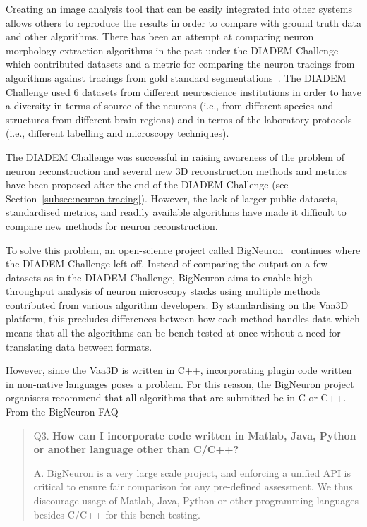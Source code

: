 Creating an image analysis tool that can be easily integrated into
other systems allows others to reproduce the results in order to
compare with ground truth data and other algorithms. There
has been an attempt at comparing neuron morphology extraction
algorithms in the past under the DIADEM Challenge which
contributed datasets and a metric for comparing the neuron
tracings from algorithms against tracings from gold standard
segmentations~\autocite{DIADEM&Beyond:Liu:2011,DIADEM-dataset:Brown:2011,DIADEM-metric-Gillette2011}.
The DIADEM Challenge used 6 datasets from different neuroscience
institutions in order to have a diversity in terms of source of
the neurons (i.e., from different species and structures from
different brain regions) and in terms of the laboratory protocols
(i.e., different labelling and microscopy techniques).

The DIADEM Challenge was successful in raising awareness of the
problem of neuron reconstruction and several new 3D reconstruction
methods and metrics have been proposed after the end of the DIADEM
Challenge (see Section~\ref{subsec:neuron-tracing}).  However, the
lack of larger public datasets, standardised metrics, and readily
available algorithms have made it difficult to compare new methods
for neuron reconstruction.

To solve this problem, an open-science project called
BigNeuron~\autocite{BigNeuron:Peng:2015,DIADEM2BigNeuron:Peng:2015}
continues where the DIADEM Challenge left off. Instead of
comparing the output on a few datasets as in the DIADEM Challenge,
BigNeuron aims to enable high-throughput analysis of neuron
microscopy stacks using multiple methods contributed from various
algorithm developers. By standardising on the Vaa3D platform, this
precludes differences between how each method handles data which
means that all the algorithms can be bench-tested at once without
a need for translating data between formats.

However, since the Vaa3D is written in C++, incorporating plugin
code written in non-native languages poses a problem. For this
reason, the BigNeuron project organisers recommend that all
algorithms that are submitted be in C or C++. From the BigNeuron
FAQ~\autocite{BigNeuron:FAQ:2015}\\
\parbox{\textwidth}{
\begin{quote}
	\begin{fancyquote}
		{Q3. \bfseries How can I incorporate code written in Matlab, Java, Python or another language other than C/C++?}

		A. BigNeuron is a very large scale project, and enforcing a
		unified API is critical to ensure fair comparison for any pre-defined
		assessment. We thus discourage usage of Matlab, Java, Python or other
		programming languages besides C/C++ for this bench
		testing.
	\end{fancyquote}
\end{quote}
}

